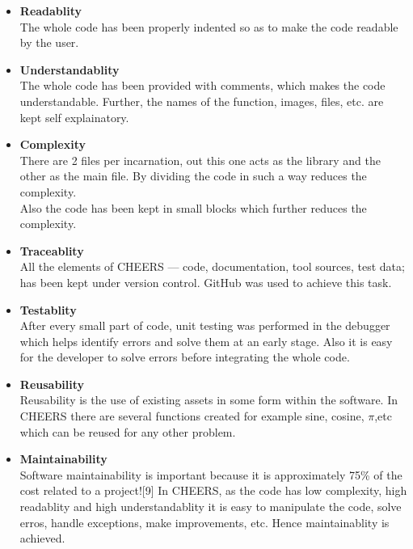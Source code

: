 \documentclass[11pt]{article}
\begin{document}
		\begin{itemize}
			
			\item \textbf{Readablity}\\
			The whole code has been properly indented so as to make the code readable by the user.
			
			\item \textbf{Understandablity}\\
			The whole code has been provided with comments, which makes the code understandable. Further, the names of the function, images, files, etc. are kept self explainatory.
			
			\item \textbf{Complexity}\\
			There are 2 files per incarnation, out this one acts as the library and the other as the main file. By dividing the code in such a way reduces the complexity.\\
			Also the code has been kept in small blocks which further reduces the complexity.
			
			\item \textbf{Traceablity}\\
			All the elements of CHEERS — code, documentation, tool sources, test data; has been kept under version control. GitHub was used to achieve this task.
			
			\item \textbf{Testablity}\\
			After every small part of code, unit testing was performed in the debugger which helps identify errors and solve them at an early stage. Also it is easy for the developer to solve errors before integrating the whole code.
			
			\item \textbf{Reusability}\\
			Reusability is the use of existing assets in some form within the software. In CHEERS there are several functions created for example sine, cosine, $\pi$,etc which can be reused for any other problem. 
			
			\item \textbf{Maintainability}\\
			Software maintainability is important because it is approximately 75\% of the cost related to a project![9] 
			In CHEERS, as the code has low complexity, high readablity and high understandablity it is easy to manipulate the code, solve erros, handle exceptions, make improvements, etc. Hence maintainablity is achieved. 
		\end{itemize}
\end{document}
